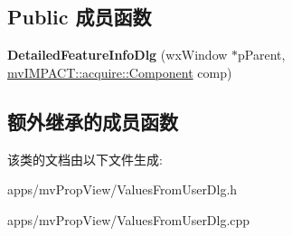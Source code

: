 \subsection*{Public 成员函数}
\begin{DoxyCompactItemize}
\item 
\hypertarget{class_detailed_feature_info_dlg_a4b976d2f6990546dc73dff002e03b7ac}{{\bfseries Detailed\+Feature\+Info\+Dlg} (wx\+Window $\ast$p\+Parent, \hyperlink{classmv_i_m_p_a_c_t_1_1acquire_1_1_component}{mv\+I\+M\+P\+A\+C\+T\+::acquire\+::\+Component} comp)}\label{class_detailed_feature_info_dlg_a4b976d2f6990546dc73dff002e03b7ac}

\end{DoxyCompactItemize}
\subsection*{额外继承的成员函数}


该类的文档由以下文件生成\+:\begin{DoxyCompactItemize}
\item 
apps/mv\+Prop\+View/Values\+From\+User\+Dlg.\+h\item 
apps/mv\+Prop\+View/Values\+From\+User\+Dlg.\+cpp\end{DoxyCompactItemize}
